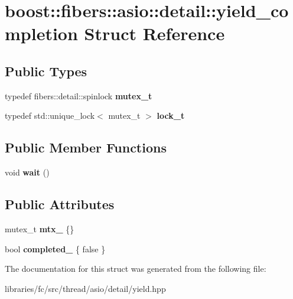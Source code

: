 \hypertarget{structboost_1_1fibers_1_1asio_1_1detail_1_1yield__completion}{}\section{boost\+:\+:fibers\+:\+:asio\+:\+:detail\+:\+:yield\+\_\+completion Struct Reference}
\label{structboost_1_1fibers_1_1asio_1_1detail_1_1yield__completion}
\subsection*{Public Types}
\begin{DoxyCompactItemize}
\item 
\mbox{\label{structboost_1_1fibers_1_1asio_1_1detail_1_1yield__completion_a279fad7c46bbe1310fc1ddc2947364ab}} 
typedef fibers\+::detail\+::spinlock {\bfseries mutex\+\_\+t}
\item 
\mbox{\label{structboost_1_1fibers_1_1asio_1_1detail_1_1yield__completion_a7e1d3e2bb369a13f01b3c70718187234}} 
typedef std\+::unique\+\_\+lock$<$ mutex\+\_\+t $>$ {\bfseries lock\+\_\+t}
\end{DoxyCompactItemize}
\subsection*{Public Member Functions}
\begin{DoxyCompactItemize}
\item 
\mbox{\label{structboost_1_1fibers_1_1asio_1_1detail_1_1yield__completion_abe924cb1844f3bdbc6ea1fa1a52fb15d}} 
void {\bfseries wait} ()
\end{DoxyCompactItemize}
\subsection*{Public Attributes}
\begin{DoxyCompactItemize}
\item 
\mbox{\label{structboost_1_1fibers_1_1asio_1_1detail_1_1yield__completion_ad7abb35be3a92d7984eea43849538e28}} 
mutex\+\_\+t {\bfseries mtx\+\_\+} \{\}
\item 
\mbox{\label{structboost_1_1fibers_1_1asio_1_1detail_1_1yield__completion_abf48abdc8c855a42980e551adfdb728f}} 
bool {\bfseries completed\+\_\+} \{ false \}
\end{DoxyCompactItemize}


The documentation for this struct was generated from the following file\+:\begin{DoxyCompactItemize}
\item 
libraries/fc/src/thread/asio/detail/yield.\+hpp\end{DoxyCompactItemize}
